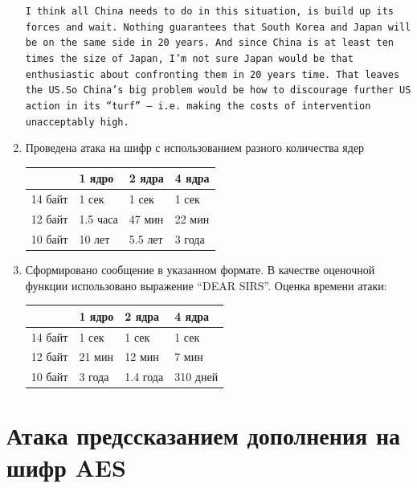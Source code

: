 \documentclass[a4paper, 14pt]{extarticle}
\begin{document}
\begin{enumerate}
        \texttt{I think all China needs to do in this situation, is build up its forces and wait. Nothing guarantees that South Korea and Japan will be on the same side in 20 years. And since China is at least ten times the size of Japan, I'm not sure Japan would be that enthusiastic about confronting them in 20 years time. That leaves the US.\@ So China's big problem would be how to discourage further US action in its ``turf'' --- i.e.\ making the costs of intervention unacceptably high.}
    \item Проведена атака на шифр с использованием разного количества ядер
        \begin{table}[h]
            \centering
            \begin{tabular}{@{}llll@{}}
                \toprule
 & \textbf{1 ядро} & \textbf{2 ядра} & \textbf{4 ядра} \\ \midrule
                14 байт & 1 сек & 1 сек & 1 сек \\
                12 байт & 1.5 часа & 47 мин & 22 мин \\
                10 байт & 10 лет & 5.5 лет & 3 года \\ \bottomrule
            \end{tabular}
        \end{table}
    \item Сформировано сообщение в указанном формате. В качестве оценочной функции использовано выражение \enquote{DEAR SIRS}. Оценка времени атаки:
        \begin{table}[h]
            \centering
            \begin{tabular}{@{}llll@{}}
                \toprule
 & \textbf{1 ядро} & \textbf{2 ядра} & \textbf{4 ядра} \\ \midrule
                14 байт & 1 сек & 1 сек & 1 сек \\
                12 байт & 21 мин & 12 мин & 7 мин \\
                10 байт & 3 года & 1.4 года & 310 дней \\ \bottomrule
            \end{tabular}
        \end{table}

\end{enumerate}

\section{Атака предссказанием дополнения на шифр AES}
\end{document}
